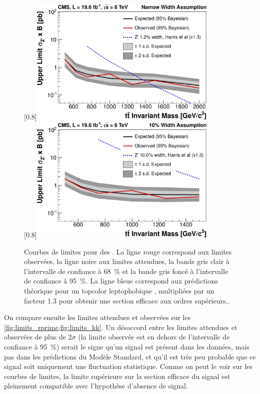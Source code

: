 \begin{figure}[tbp] \centering
    [0.8\textwidth]{\includegraphics[width=0.8\textwidth]{chapitre7/figs/limits_narrow.pdf}} \\ \vspace{5mm}
    [0.8\textwidth]{\includegraphics[width=0.8\textwidth]{chapitre7/figs/limits_large.pdf}}
    \caption{Courbes de limites pour des \zprime. La ligne rouge correspond aux limites observées, la ligne noire aux limites attendues, la bande gris clair à l'intervalle de confiance à \SI{68}{\percent} et la bande gris foncé à l'intervalle de confiance à \SI{95}{\%}. La ligne bleue correspond aux prédictions théorique pour un \zprime topcolor leptophobique \citep{Harris:2011ez}, multipliées par un facteur \num{1.3} pour obtenir une section efficace aux ordres supérieurs..}
    \label{fig:limits_zprime}
\end{figure}
On compare ensuite les limites attendues et observées sur les \cref{fig:limits_zprime,fig:limits_kk}. Un désaccord entre les limites attendues et observées de plus de 2$\sigma$ (la limite observée est en dehors de l'intervalle de confiance à \SI{95}{\%}) serait le signe qu'un signal est présent dans les données, mais pas dans les prédictions du Modèle Standard, et qu'il est très peu probable que ce signal soit uniquement une fluctuation statistique. Comme on peut le voir sur les courbes de limites, la limite supérieure sur la section efficace du signal est pleinement compatible avec l'hypothèse d'absence de signal.

